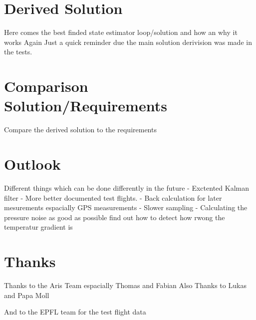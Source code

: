 \section{Derived Solution}
Here comes the best finded state estimator loop/solution and how an why it works
Again Just a quick reminder due the main solution derivision was made in the tests.


\section{Comparison Solution/Requirements}
Compare the derived solution to the requirements

\section{Outlook}
Different things which can be done differently in the future
- Exctented Kalman filter
- More better documented test flights.
- Back calculation for later mesurements espacially GPS measurements
- Slower sampling
- Calculating the pressure noise as good as possible find out how to detect how rwong the temperatur gradient is

\section{Thanks}
Thanks to the Aris Team espacially Thomas and Fabian
Also Thanks to Lukas and Papa Moll

And to the EPFL team for the test flight data

